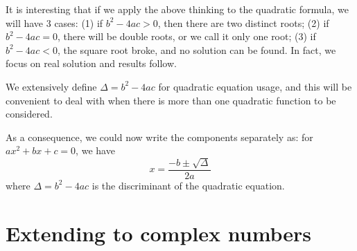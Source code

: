 \documentclass[12pt]{article}
\begin{document}
    It is interesting that if we apply the above thinking to the quadratic formula, we will have 3 cases: (1) if $b^2-4ac>0$, then there are two distinct roots; (2) if $b^2-4ac=0$, there will be double roots, or we call it only one root; (3) if $b^2-4ac<0$, the square root broke, and no solution can be found. In fact, we focus on real solution and results follow.

    We extensively define $\Delta=b^2-4ac$ for quadratic equation usage, and this will be convenient to deal with when there is more than one quadratic function to be considered.

    As a consequence, we could now write the components separately as: for $ax^2+bx+c=0$, we have $$x=\frac{-b\pm\sqrt{\Delta}}{2a}$$ where $\Delta=b^2-4ac$ is the discriminant of the quadratic equation.

    \section*{Extending to complex numbers}
    
\end{document}
